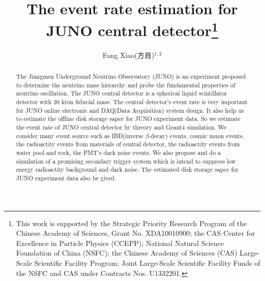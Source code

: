\documentclass[a4paper,10pt,twoside]{paper}
\begin{document}

	\title{The event rate estimation for JUNO central detector\thanks{This work is supported by the Strategic Priority Research Program of the Chinese Academy of Sciences, Grant No. XDA10010900; the CAS Center for Excellence in Particle Physics (CCEPP); National Natural Science Foundation of China (NSFC); the Chinese Academy of Sciences (CAS) Large-Scale Scientific Facility Program; Joint Large-Scale Scientific Facility Funds of the NSFC and CAS under Contracts Nos. U1332201.} }


	\author{Fang Xiao(方肖)$^{1,2}$
	}
	\maketitle

	\address{
		$^1$ School of Physics, Sichuan University, Chengdu 610065 , China\\
		$^2$ Institute of High Energy Physics, Chinese Academy of Sciences, Beijing 100049, China\\
	}

	\begin{abstract}
		The Jiangmen Underground Neutrino Observatory (JUNO) is an experiment proposed to determine
		the neutrino mass hierarchy and probe the fundamental properties of neutrino oscillation. 
		The JUNO central detector is a spherical liquid scintillator detector with 20 kton fiducial mass. 
		The central detector's event rate is very important for JUNO online 
		electronic and DAQ(Data Acquisition)
		system design. It also help us to estimate the offline disk storage sapce for JUNO experiment data.
		So we estimate the event rate of JUNO central detector by threory and Geant4 simulation. 
		We consider many event source such
		as IBD(inverse $\beta$-decay) events, cosmic muon events, the radioactity events from materials of
		central detector, the radioactity events from water pool and rock, the PMT's dark noise events.
		We also propose and do a simulation of a promising secondary trigger system which is intend to
		suppress low energy 
		radioactity background and dark noise. The estimated disk storage sapce for JUNO experiment data
		also be gived.

	\end{abstract}
\end{document}
